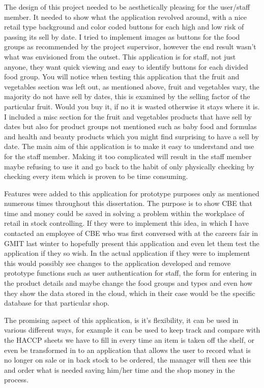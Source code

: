The design of this project needed to be aesthetically pleasing for the user/staff member. It needed to show what the application revolved around, with a nice retail type background and color coded buttons for each high and low risk of passing its sell by date. I tried to implement images as buttons for the food groups as recommended by the project supervisor, however the end result wasn't what was envisioned from the outset. This application is for staff, not just anyone, they want quick viewing and easy to identify buttons for each divided food group. You will notice when testing this application that the fruit and vegetables section was left out, as mentioned above, fruit and vegetables vary, the majority do not have sell by dates, this is examined by the selling factor of the particular fruit. Would you buy it, if no it is wasted otherwise it stays where it is. I included a misc section for the fruit and vegetables products that have sell by dates but also for product groups not mentioned such as baby food and formulas and health and beauty products which you might find surprising to have a sell by date. The main aim of this application is to make it easy to understand and use for the staff member. Making it too complicated will result in the staff member maybe refusing to use it and go back to the habit of only physically checking by checking every item which is proven to be time consuming.
\newline

Features were added to this application for prototype purposes only as mentioned numerous times throughout this dissertation. The purpose is to show CBE that time and money could be saved in solving a problem within the workplace of retail in stock controlling. If they were to implement this idea, in which I have contacted an employee of CBE who was first conversed with at the careers fair in GMIT last winter to hopefully present this application and even let them test the application if they so wish. In the actual application if they were to implement this would possibly see changes to the application developed and remove prototype functions such as user authentication for staff, the form for entering in the product details and maybe change the food groups and types and even how they show the data stored in the cloud, which in their case would be the specific database for that particular shop. 
\newline 

\newpage
The promising aspect of this application, is it's flexibility, it can be used in various different ways, for example it can be used to keep track and compare with the HACCP sheets we have to fill in every time an item is taken off the shelf, or even be transformed in to an application that allows the user to record what is no longer on sale or in back stock to be ordered, the manager will then see this and order what is needed saving him/her time and the shop money in the process.

